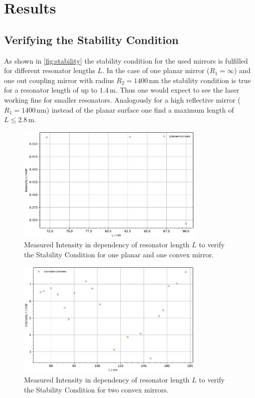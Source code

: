 \section{Results}


\subsection{Verifying the Stability Condition}
As shown in \autoref{fig:stability} the stability condition for the used mirrors is fulfilled for different resonator lengths $L$. In the case of one planar mirror ($R_1=\infty$) and one out coupling mirror with radius $R_2=1400\, \unit{\nano \meter}$ the stability condition is true for 
a resonator length of up to $1.4\, \unit{\meter}$. Thus one would expect to see the laser working fine for smaller resonators. Analogously for a high reflective mirror ($R_1=1400\, \unit{\nano \meter}$) instead of the planar surface one find a maximum length of $L\leq 2.8\, \unit{\meter}$.
\begin{figure}
	\centering
	\includegraphics[width=0.8\textwidth]{content/plots/stability2.pdf}
	\caption{Measured Intensity in dependency of resonator length $L$ to verify the Stability Condition for one planar and one convex mirror.}
	\label{fig:stability2}
\end{figure}
\begin{figure}
	\centering
	\includegraphics[width=0.8\textwidth]{content/plots/stability1.pdf}
	\caption{Measured Intensity in dependency of resonator length $L$ to verify the Stability Condition for two convex mirrors.}
	\label{fig:stability1}
\end{figure}
